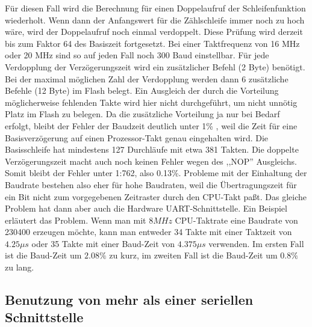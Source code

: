 Für diesen Fall wird die Berechnung für einen Doppelaufruf der Schleifenfunktion wiederholt. 
Wenn dann der Anfangswert für die Zählschleife immer noch zu hoch wäre, wird der Doppelaufruf noch einmal
verdoppelt. Diese Prüfung wird derzeit bis zum Faktor 64 des Basiszeit fortgesetzt.
Bei einer Taktfrequenz von 16 MHz oder 20 MHz sind so auf jeden Fall noch 300 Baud einstellbar.
Für jede Verdopplung der Verzögerungszeit wird ein zusätzlicher Befehl (2 Byte) benötigt. 
Bei der maximal möglichen Zahl der Verdopplung werden dann 6 zusätzliche Befehle (12 Byte) im Flash belegt.
Ein Ausgleich der durch die Vorteilung möglicherweise fehlenden Takte wird hier nicht durchgeführt,
um nicht unnötig Platz im Flash zu belegen.
Da die zusätzliche Vorteilung ja nur bei Bedarf erfolgt, bleibt der Fehler der Baudzeit deutlich unter 1\% ,
weil die Zeit für eine Basisverzögerung auf einen Prozessor-Takt genau eingehalten wird.
Die Basisschleife hat mindestens 127 Durchläufe mit etwa 381 Takten. Die doppelte Verzögerungszeit
macht auch noch keinen Fehler wegen des ,,NOP'' Ausgleichs. Somit bleibt der Fehler unter 1:762,
also 0.13\%. Probleme mit der Einhaltung der Baudrate bestehen also eher für hohe Baudraten,
weil die Übertragungszeit für ein Bit nicht zum vorgegebenen Zeitraster durch den CPU-Takt paßt.
Das gleiche Problem hat dann aber auch die Hardware UART-Schnittstelle.
Ein Beispiel erläutert das Problem.
Wenn man mit \(8 MHz\) CPU-Taktrate eine Baudrate von 230400 erzeugen möchte, 
kann man entweder 34 Takte mit einer Taktzeit von \(4.25\mu s\) oder 35 Takte
mit einer Baud-Zeit von \(4.375\mu s\) verwenden. Im ersten Fall ist die Baud-Zeit
um \(2.08\%\) zu kurz, im zweiten Fall ist die Baud-Zeit um \(0.8\%\) zu lang.


\subsection{Benutzung von mehr als einer seriellen Schnittstelle}

